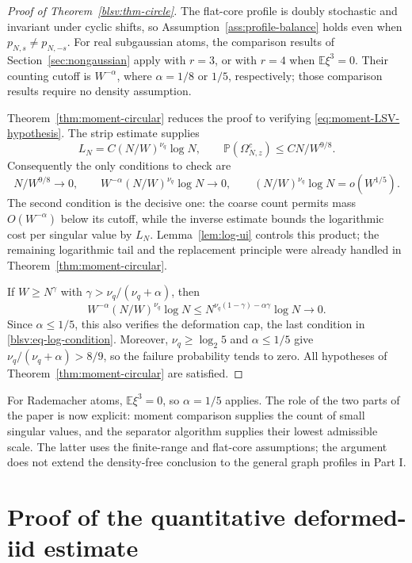 \documentclass[11pt,reqno]{amsart}
\numberwithin{equation}{section}
\theoremstyle{plain}
\theoremstyle{definition}
\theoremstyle{remark}
\begin{document}
\begin{proof}[Proof of Theorem~\ref{blsv:thm-circle}]
The flat-core profile is doubly stochastic and invariant under cyclic
shifts, so Assumption~\ref{ass:profile-balance} holds even when
$p_{N,s}\ne p_{N,-s}$. For real subgaussian atoms, the comparison results
of Section~\ref{sec:nongaussian} apply with $r=3$, or with $r=4$ when
$\mathbb E\xi^3=0$. Their counting cutoff is $W^{-\alpha}$, where
$\alpha=1/8$ or $1/5$, respectively; those comparison results require
no density assumption.

Theorem~\ref{thm:moment-circular} reduces the proof to verifying
\eqref{eq:moment-LSV-hypothesis}. The strip estimate supplies
\[
 L_N=C(N/W)^{\nu_q}\log N,\qquad
 \mathbb P(\Omega_{N,z}^c)\le CN/W^{9/8}.
\]
Consequently the only conditions to check are
\begin{equation}\label{blsv:eq-log-condition}
 N/W^{9/8}\to0,\qquad
 W^{-\alpha}(N/W)^{\nu_q}\log N\to0,\qquad
 (N/W)^{\nu_q}\log N=o(W^{1/5}).
\end{equation}
The second condition is the decisive one: the coarse count permits
mass $O(W^{-\alpha})$ below its cutoff, while the inverse estimate
bounds the logarithmic cost per singular value by $L_N$.
Lemma~\ref{lem:log-ui} controls this product; the remaining logarithmic
tail and the replacement principle were already handled in
Theorem~\ref{thm:moment-circular}.

If $W\ge N^\gamma$ with $\gamma>\nu_q/(\nu_q+\alpha)$, then
\[
 W^{-\alpha}(N/W)^{\nu_q}\log N
 \le N^{\nu_q(1-\gamma)-\alpha\gamma}\log N\longrightarrow0.
\]
Since $\alpha\le1/5$, this also verifies the deformation cap, the last
condition in \eqref{blsv:eq-log-condition}. Moreover,
$\nu_q\ge\log_2 5$ and $\alpha\le1/5$ give
$\nu_q/(\nu_q+\alpha)>8/9$, so the failure probability tends to zero.
All hypotheses of Theorem~\ref{thm:moment-circular} are satisfied.
\end{proof}

For Rademacher atoms, $\mathbb E\xi^3=0$, so $\alpha=1/5$ applies.
The role of the two parts of the paper is now explicit: moment
comparison supplies the count of small singular values, and the
separator algorithm supplies their lowest admissible scale. The latter
uses the finite-range and flat-core assumptions; the argument does not
extend the density-free conclusion to the general graph profiles in
Part I.

\section{Proof of the quantitative deformed-iid estimate}\label{blsv:sec-local}
\end{document}
